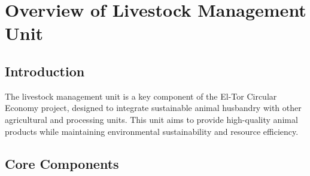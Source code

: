 \section{Overview of Livestock Management Unit}

\subsection{Introduction}
The livestock management unit is a key component of the El-Tor Circular Economy project, designed to integrate sustainable animal husbandry with other agricultural and processing units. This unit aims to provide high-quality animal products while maintaining environmental sustainability and resource efficiency.

\subsection{Core Components}
